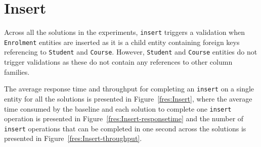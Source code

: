 \section{Insert} \label{s:results-insert}
Across all the solutions in the experiments,   \texttt{insert}  triggers a
validation when \texttt{Enrolment} entities are inserted as it is a child entity
containing foreign keys referencing to \texttt{Student} and \texttt{Course}. 
However,  \texttt{Student} and \texttt{Course} entities do not trigger
validations as these do not contain any references to other column families.  

The average response time and throughput for completing an \texttt{insert} on a
single entity for all the solutions is presented in Figure~\ref{fres:Insert},  
where  the average time consumed by the baseline and each solution to complete one \texttt{insert} operation is presented in 
Figure~\ref{fres:Insert-responsetime} and 
 the number of \texttt{insert}
operations that can be completed in one second across the solutions is
presented in  Figure~\ref{fres:Insert-throughput}. 

